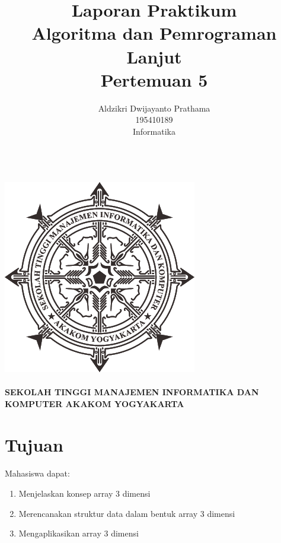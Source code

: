 \documentclass[a4paper,12pt]{article}
\begin{document}
\title{ {\Large Laporan Praktikum}\\ Algoritma dan Pemrograman Lanjut\\{\Large Pertemuan 5}}

\author{Aldzikri Dwijayanto Prathama
    \\195410189
    \\Informatika}
\makeatletter
\begin{titlepage}
    \begin{center}
        {\huge \bfseries \@title}\\[14ex]
        \includegraphics[scale=.8]{logo}\\[4ex]
        {\large \@author}\\[12ex]
        {\large \bfseries {SEKOLAH TINGGI MANAJEMEN INFORMATIKA DAN KOMPUTER
            AKAKOM YOGYAKARTA}}
    \end{center}


\end{titlepage}
\makeatother
\newpage
\tableofcontents
\newpage

\section{Tujuan}
\paragraph{}
Mahasiswa dapat:
\begin{enumerate}
    \item Menjelaskan konsep array 3 dimensi
    \item Merencanakan struktur data dalam bentuk array 3 dimensi
    \item Mengaplikasikan array 3 dimensi
\end{enumerate}
\end{document}
